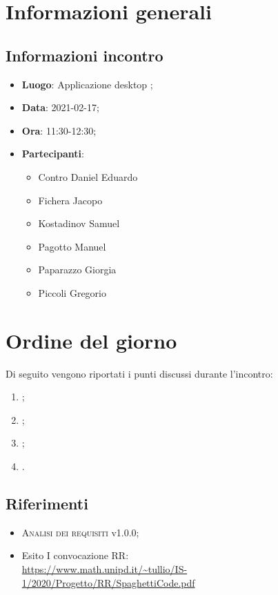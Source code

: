 \documentclass{article}
\begin{document}


\section{Informazioni generali}
\label{sec:info_generali}

\subsection{Informazioni incontro}
\label{sub:info_incontro}

\begin{itemize}
	\item \textbf{Luogo}: Applicazione desktop ;
	\item \textbf{Data}: 2021-02-17;
	\item \textbf{Ora}: 11:30-12:30;
	\item \textbf{Partecipanti}:
	\begin{itemize}
		\item Contro Daniel Eduardo
		\item Fichera Jacopo
		\item Kostadinov Samuel
		\item Pagotto Manuel
		\item Paparazzo Giorgia
		\item Piccoli Gregorio
	\end{itemize}
\end{itemize}

\section{Ordine del giorno}%
\label{sec:ordine_del_giorno}

Di seguito vengono riportati i punti discussi durante l'incontro:
\begin{enumerate}
	\item {};
	\item {};
	\item {};
	\item {}.
\end{enumerate}


\subsection{Riferimenti}%
\label{sub:riferimenti}
\begin{itemize}
    \item \textsc{Analisi dei requisiti} v1.0.0;
	\item Esito I convocazione RR: \\
		\url{https://www.math.unipd.it/~tullio/IS-1/2020/Progetto/RR/SpaghettiCode.pdf}
\end{itemize}
\end{document}
